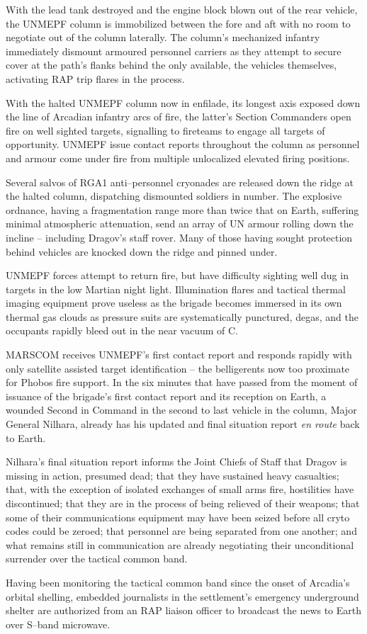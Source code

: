 With the lead tank destroyed and the engine block blown out of the rear vehicle, the UNMEPF column is immobilized between the fore and aft with no room to negotiate out of the column laterally. The column's mechanized infantry immediately dismount armoured personnel carriers as they attempt to secure cover at the path's flanks behind the only available, the vehicles themselves, activating RAP trip flares in the process.

With the halted UNMEPF column now in enfilade, its longest axis exposed down the line of Arcadian infantry arcs of fire, the latter's Section Commanders open fire on well sighted targets, signalling to fireteams to engage all targets of opportunity. UNMEPF issue contact reports throughout the column as personnel and armour come under fire from multiple unlocalized elevated firing positions.

Several salvos of RGA1 anti--personnel cryonades are released down the ridge at the halted column, dispatching dismounted soldiers in number. The explosive ordnance, having a fragmentation range more than twice that on Earth, suffering minimal atmospheric attenuation, send an array of UN armour rolling down the incline -- including Dragov's staff rover. Many of those having sought protection behind vehicles are knocked down the ridge and pinned under.

UNMEPF forces attempt to return fire, but have difficulty sighting well dug in targets in the low Martian night light. Illumination flares and tactical thermal imaging equipment prove useless as the brigade becomes immersed in its own thermal gas clouds as pressure suits are systematically punctured, degas, and the occupants rapidly bleed out in the near vacuum of C.

MARSCOM receives UNMEPF's first contact report and responds rapidly with only satellite assisted target identification -- the belligerents now too proximate for Phobos fire support. In the six minutes that have passed from the moment of issuance of the brigade's first contact report and its reception on Earth, a wounded Second in Command in the second to last vehicle in the column, Major General Nilhara, already has his updated and final situation report {\it en route} back to Earth.

Nilhara's final situation report informs the Joint Chiefs of Staff that Dragov is missing in action, presumed dead; that they have sustained heavy casualties; that, with the exception of isolated exchanges of small arms fire, hostilities have discontinued; that they are in the process of being relieved of their weapons; that some of their communications equipment may have been seized before all cryto codes could be zeroed; that personnel are being separated from one another; and what remains still in communication are already negotiating their unconditional surrender over the tactical common band.

Having been monitoring the tactical common band since the onset of Arcadia's orbital shelling, embedded journalists in the settlement's emergency underground shelter are authorized from an RAP liaison officer to broadcast the news to Earth over S--band microwave.
\StopTimelineDate

